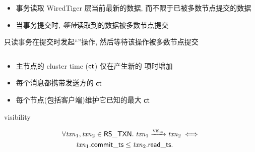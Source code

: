 \begin{frame}{}
  \begin{center}

	\vspace{0.30cm}
	\begin{itemize}
	  \item 事务读取 WiredTiger 层当前最新的数据, 而不限于已被多数节点提交的数据
	  \item 当事务提交时, \emph{等待}读取到的数据被多数节点提交
	\end{itemize}

	\pause
	只读事务在提交时发起``\noop''操作, 然后等待该操作被多数节点提交
  \end{center}
\end{frame}

\begin{frame}{}

  \begin{columns}
	  
  \end{columns}

  \pause
  \vspace{0.30cm}
  \begin{center}
	\begin{itemize}
	  \setlength{\itemsep}{6pt}
	  \item 主节点的 cluster time ($\sf ct$) 仅在产生新的 \oplog{} 项时增加
	  \item 每个消息都携带发送方的 $\sf ct$
	  \item 每个节点(包括客户端)维护它已知的最大 $\sf ct$
	\end{itemize}
  \end{center}
\end{frame}

\begin{frame}{}
  visibility
\end{frame}

\begin{frame}{}
  \begin{definition}
	\vspace{-0.30cm}
	\begin{align*}
      &\forall \mathit{txn}_{1}, \mathit{txn}_{2} \in {\sf RS\_TXN}.\;
        \mathit{txn}_{1} \xrightarrow{\textsc{vis}_{\textsc{rs}}} \mathit{txn}_{2} \iff \\
        &\qquad \mathit{txn}_{1}.{\sf commit\_ts} \le \mathit{txn}_{2}.{\sf read\_ts}.
	\end{align*}
  \end{definition}
\end{frame}

